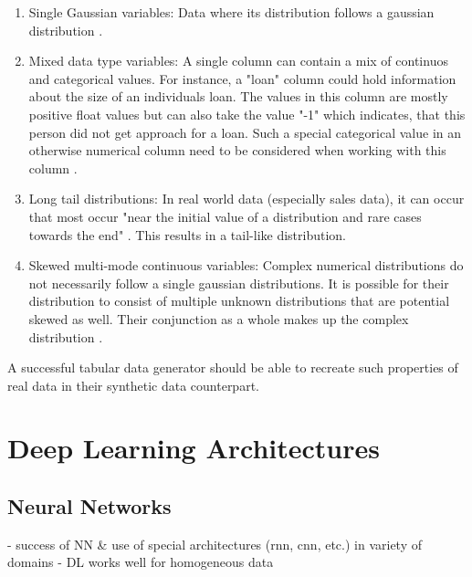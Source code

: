\begin{enumerate}
    \item Single Gaussian variables: Data where its distribution follows a gaussian distribution \cite{zhao2022CTABGANEnhancingTabular}.
    \item Mixed data type variables: A single column can contain a mix of continuos and categorical values. 
    For instance, a "loan" column could hold information about the size of an individuals loan.
    The values in this column are mostly positive float values but can also take the value "-1" which indicates, that this person did not get approach for a loan.
    Such a special categorical value in an otherwise numerical column need to be considered when working with this column \cite{zhao2022CTABGANEnhancingTabular}.
    \item Long tail distributions: In real world data (especially sales data), it can occur that most occur "near the initial value of a distribution and rare cases towards the end" \cite[p. 3]{zhao2022CTABGANEnhancingTabular}.
    This results in a tail-like distribution.
    \item Skewed multi-mode continuous variables: Complex numerical distributions do not necessarily follow a single gaussian distributions.
    It is possible for their distribution to consist of multiple unknown distributions that are potential skewed as well. 
    Their conjunction as a whole makes up the complex distribution \cite{zhao2022CTABGANEnhancingTabular}.
\end{enumerate}

A successful tabular data generator should be able to recreate such properties of real data in their synthetic data counterpart.



\section{Deep Learning Architectures}
\label{ch:preliminaries-deepLearningArchitectures}

\subsection{Neural Networks}
\label{ch:preliminaries-deepLearningArchitectures-neuralNetworks}

- success of NN \& use of special architectures (rnn, cnn, etc.) in variety of domains \cite{borisov2022DeepNeuralNetworks}
- DL works well for homogeneous data \cite{borisov2022DeepNeuralNetworks}

